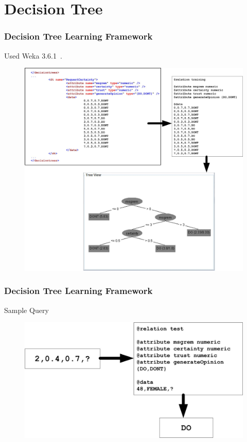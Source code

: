 \section{Decision Tree}
\begin{frame}
\frametitle{Decision Tree Learning Framework}

Used Weka 3.6.1~\citep*{weka}.

\begin{figure}
\centering
\includegraphics[height=0.75\textheight]{../report/images/xml2dtxtra}
\end{figure}

\end{frame}

\begin{frame}
\frametitle{Decision Tree Learning Framework}

Sample Query

\begin{figure}
\centering
\includegraphics[width=1\textwidth]{../report/images/xml2dttest}
\end{figure}

\end{frame}